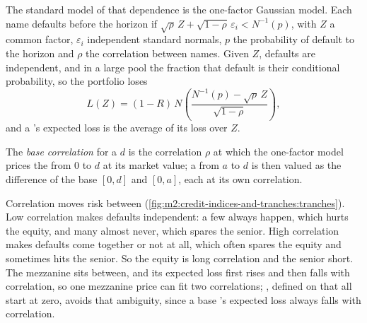 The standard model of that dependence is the one-factor Gaussian model. Each name
defaults before the horizon if $\sqrt\rho\,Z + \sqrt{1-\rho}\,\varepsilon_i <
N^{-1}(p)$, with $Z$ a common factor, $\varepsilon_i$ independent standard normals, $p$
the probability of default to the horizon and $\rho$ the correlation between names.
Given $Z$, defaults are independent, and in a large pool the fraction that default is
their conditional probability, so the portfolio loses
\[
L(Z) = (1 - R)\, N\!\left(\frac{N^{-1}(p) - \sqrt{\rho}\,Z}{\sqrt{1 - \rho}}\right),
\]
and a 's expected loss is the average of its loss over $Z$.

\begin{definition}\label{def:m2:credit-indices-and-tranches:basecorr}
The \emph{base correlation} for a  $d$ is the
correlation $\rho$ at which the one-factor model prices the  from 0 to $d$ at
its market value; a  from $a$ to $d$ is then valued as the difference of the
base  $[0,d]$ and $[0,a]$, each at its own correlation.
\end{definition}

Correlation moves risk between 
(\cref{fig:m2:credit-indices-and-tranches:tranches}). Low correlation makes defaults
independent: a few always happen, which hurts the equity, and many almost never, which
spares the senior. High correlation makes defaults come together or not at all, which
often spares the equity and sometimes hits the senior. So the equity is long
correlation and the senior short. The mezzanine sits between, and its expected loss
first rises and then falls with correlation, so one mezzanine price can fit two
correlations; , defined on  that all start at zero, avoids
that ambiguity, since a base 's expected loss always falls with correlation.

